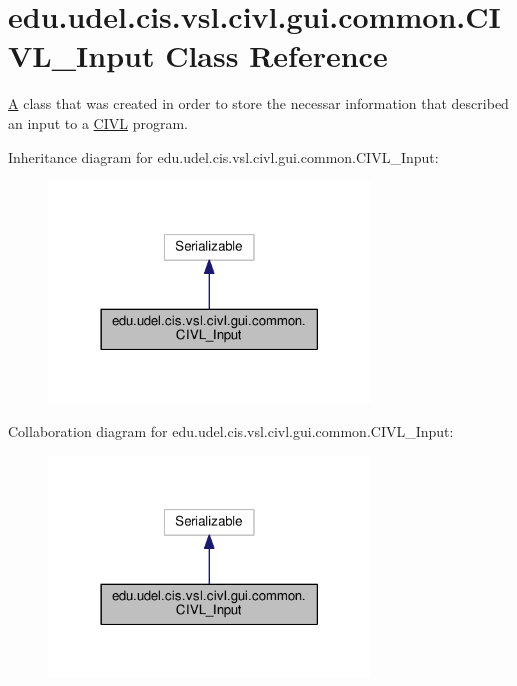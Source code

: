 \hypertarget{classedu_1_1udel_1_1cis_1_1vsl_1_1civl_1_1gui_1_1common_1_1CIVL__Input}{}\section{edu.\+udel.\+cis.\+vsl.\+civl.\+gui.\+common.\+C\+I\+V\+L\+\_\+\+Input Class Reference}
\label{classedu_1_1udel_1_1cis_1_1vsl_1_1civl_1_1gui_1_1common_1_1CIVL__Input}


\hyperlink{structA}{A} class that was created in order to store the necessar information that described an input to a \hyperlink{classedu_1_1udel_1_1cis_1_1vsl_1_1civl_1_1CIVL}{C\+I\+V\+L} program.  




Inheritance diagram for edu.\+udel.\+cis.\+vsl.\+civl.\+gui.\+common.\+C\+I\+V\+L\+\_\+\+Input\+:
\nopagebreak
\begin{figure}[H]
\begin{center}
\leavevmode
\includegraphics[width=242pt]{classedu_1_1udel_1_1cis_1_1vsl_1_1civl_1_1gui_1_1common_1_1CIVL__Input__inherit__graph}
\end{center}
\end{figure}


Collaboration diagram for edu.\+udel.\+cis.\+vsl.\+civl.\+gui.\+common.\+C\+I\+V\+L\+\_\+\+Input\+:
\nopagebreak
\begin{figure}[H]
\begin{center}
\leavevmode
\includegraphics[width=242pt]{classedu_1_1udel_1_1cis_1_1vsl_1_1civl_1_1gui_1_1common_1_1CIVL__Input__coll__graph}
\end{center}
\end{figure}
